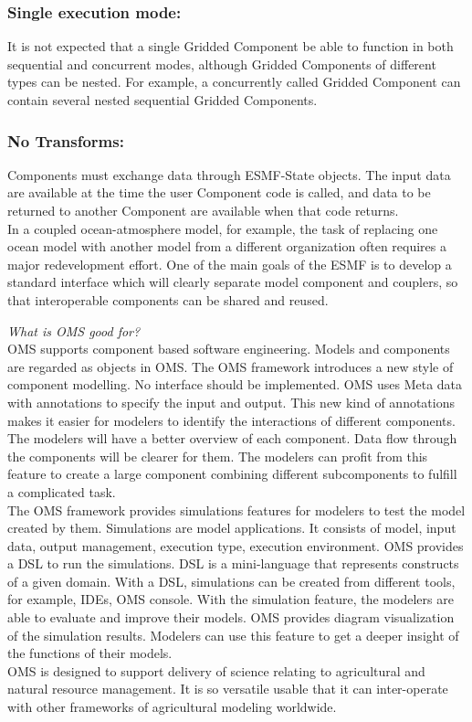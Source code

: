 \subsubsection{Single execution mode:}
It is not expected that a single Gridded Component be able to function in both sequential and concurrent modes, although Gridded Components of different types can be nested. For example, a concurrently called Gridded Component can contain several nested sequential Gridded Components.
\subsubsection{No Transforms:}
Components must exchange data through ESMF-State objects. The input data are available at the time the user Component code is called, and data to be returned to another Component are available when that code returns.\\

In a coupled ocean-atmosphere model, for example, the task of replacing one ocean model with another model from a different organization often requires a major redevelopment effort. One of the main goals of the ESMF is to develop a standard interface which will clearly separate model component and couplers, so that interoperable components can be shared and reused.


\emph{What is OMS good for?}\\
OMS supports component based software engineering. Models and components are regarded as objects in OMS. The OMS framework introduces a new style of component modelling. No interface should be implemented. OMS uses Meta data with annotations to specify the input and output. This new kind of annotations makes it easier for modelers to identify the interactions of different components. The modelers will have a better overview of each component. Data flow through the components will be clearer for them. The modelers can profit from this feature to create a large component combining different subcomponents to fulfill a complicated task.\\
The OMS framework provides simulations features for modelers to test the model created by them. Simulations are model applications. It consists of model, input data, output management, execution type, execution environment. OMS provides a DSL to run the simulations. DSL is a mini-language that represents constructs of a given domain. With a DSL, simulations can be created from different tools, for example, IDEs, OMS console. With the simulation feature, the modelers are able to evaluate and improve their models.
OMS provides diagram visualization of the simulation results. Modelers can use this feature to get a deeper insight of the functions of their models.\\
OMS is designed to support delivery of science relating to agricultural and natural resource management. It is so versatile usable that it can inter-operate with other frameworks of agricultural modeling worldwide.

